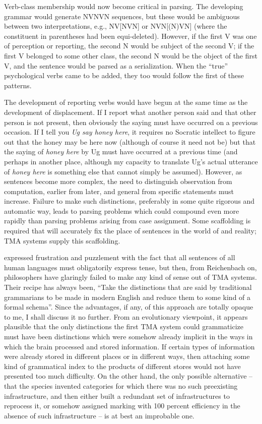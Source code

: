 Verb-class membership would now become critical in parsing.
The developing grammar would generate NVNVN sequences, but these would be ambiguous between two interpretations, e.g., NV[NVN] or NVN[(N)VN] (where the constituent in parentheses had been equi-deleted). However, if the first V was one of perception or reporting, the second N would be subject of the second V; if the first V belonged to some other class, the second N would be the object of the first V, and the sentence would be parsed as a serialization. When the ``true'' psychological verbs came to be added, they too would follow the first of these patterns.

The development of reporting verbs would have begun at the same time as the development of displacement. If I report what another person said and that other person is not present, then obviously the saying must have occurred on a previous occasion. If I tell you \textit{Ug say honey here}, it requires no Socratic intellect to figure out that the honey may be here now (although of course it need not be) but that the saying of \textit{honey here} by Ug must have occurred at a previous time (and perhaps in another place, although my capacity to translate Ug's actual utterance of \textit{honey here} is something else that cannot simply be assumed). However, as sentences become more complex, the need to distinguish observation from computation, earlier from later, and general from specific statements must increase. Failure to make such distinctions, preferably in some quite rigorous and automatic way, leads to parsing problems which could compound even more rapidly than parsing problems arising from case assignment. Some scaffolding is required that will accurately fix the place of sentences in the world of  and reality; TMA systems supply this scaffolding.

\citet[170]{Quine1960} expressed frustration and puzzlement with the fact that all sentences of all human languages must obligatorily express tense, but then, from Reichenbach on, philosophers have glaringly failed to make any kind of sense out of TMA systems. Their recipe has always been, ``Take the distinctions that are said by traditional grammarians to be made in modern English and reduce them to some kind of a formal schema''. Since the advantages, if any, of this approach are totally opaque to me, I shall discuss it no further. From
an evolutionary viewpoint, it appears plausible that the only distinc\-tions the first TMA system could grammaticize must have been distinctions which were somehow already implicit in the ways in which the brain processed and stored information. If certain types of information were already stored in different places or in different ways, then attaching some kind of grammatical index to the products of different stores would not have presented too much difficulty. On the other hand, the only possible alternative -- that the species invented categories for which there was no such preexisting infrastructure, and then either built a redundant set of infrastructures to reprocess it, or somehow assigned marking with 100 percent efficiency in the absence of such infrastructure -- is at best an improbable one.

